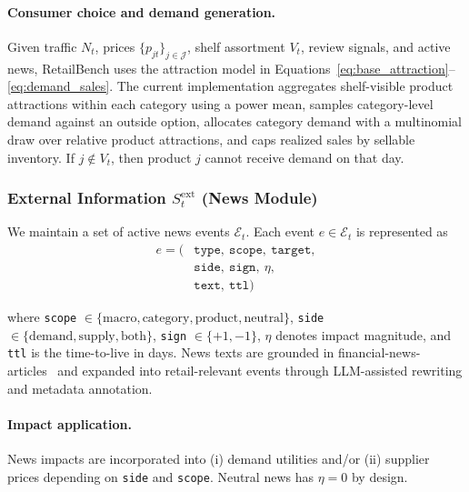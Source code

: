 \paragraph{Consumer choice and demand generation.}
Given traffic $N_t$, prices $\{p_{jt}\}_{j\in\mathcal{J}}$, shelf assortment $V_t$, review signals, and active news, RetailBench uses the attraction model in Equations~\ref{eq:base_attraction}--\ref{eq:demand_sales}. The current implementation aggregates shelf-visible product attractions within each category using a power mean, samples category-level demand against an outside option, allocates category demand with a multinomial draw over relative product attractions, and caps realized sales by sellable inventory. If $j\notin V_t$, then product $j$ cannot receive demand on that day.

\subsubsection{External Information \texorpdfstring{$S_t^{\text{ext}}$}{S t ext} (News Module)}

We maintain a set of active news events $\mathcal{E}_t$. Each event $e \in \mathcal{E}_t$ is represented as
\begin{equation}
\begin{aligned}
e = (&\texttt{type},\ \texttt{scope},\ \texttt{target},\\
     &\texttt{side},\ \texttt{sign},\ \eta,\\
     &\texttt{text},\ \texttt{ttl})
\end{aligned}
\end{equation}

where \texttt{scope} $\in \{\text{macro}, \text{category}, \text{product}, \text{neutral}\}$,
\texttt{side} $\in \{\text{demand}, \text{supply}, \text{both}\}$,
\texttt{sign} $\in \{+1,-1\}$,
$\eta$ denotes impact magnitude, and \texttt{ttl} is the time-to-live in days. News texts are grounded in financial-news-articles~\citep{ashraq2025financialNewsArticles} and expanded into retail-relevant events through LLM-assisted rewriting and metadata annotation.

\paragraph{Impact application.}
News impacts are incorporated into (i) demand utilities and/or (ii) supplier prices depending on \texttt{side} and \texttt{scope}. Neutral news has $\eta = 0$ by design.

